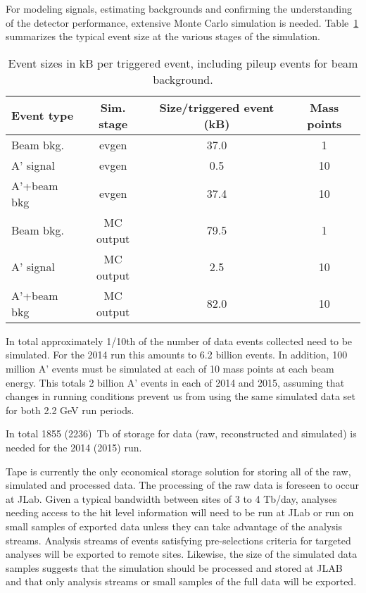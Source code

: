 For modeling signals, estimating backgrounds and confirming the understanding of the detector 
performance, extensive Monte Carlo simulation is needed. Table~\ref{tab:mc_event_size} summarizes 
the typical event size at the various stages of the simulation. 
\begin{table}[]
\centering
\begin{tabular}{|lccc|}
\hline
Event type & Sim. stage & Size/triggered event (kB) & Mass points  \\
\hline
Beam bkg.  & evgen	& 37.0	& 1	\\
A' signal & evgen	& 0.5	& 10	\\
A'+beam bkg & evgen	& 37.4	& 10	\\
\hline
Beam bkg.  & MC output	& 79.5	& 1	\\
A' signal & MC output	& 2.5	& 10	\\
A'+beam bkg & MC output	& 82.0	& 10	\\
\hline
\end{tabular}
\caption{{\small Event sizes in kB per triggered event, including pileup events for beam background. }}
\label{tab:mc_event_size}
\end{table}

In total approximately 1/10th of the number of data events collected need to be simulated. For the 2014 run this amounts to 6.2 billion events.
In addition, 100 million A' events must be simulated at each of 10 mass points at each beam energy. 
This totals 2 billion A' events in each of 2014 and 2015, assuming that changes in running conditions prevent us from using the same simulated data set for both 2.2 GeV run periods.

In total 1855 (2236)~Tb of storage for data (raw, reconstructed and simulated) is needed for the 2014 (2015) run.

Tape is currently the only economical storage
solution for storing all of the raw, simulated and processed data.
The processing of the raw data is foreseen to occur at JLab. Given a
typical bandwidth between sites of 3 to 4 Tb/day, analyses needing
access to the hit level information will need to be run at JLab or run
on small samples of exported data unless they can take advantage of the
analysis streams. Analysis streams of events satisfying
pre-selections criteria for targeted analyses will be exported to remote
sites. Likewise, the size of the simulated data samples suggests that
the simulation should be processed and stored at JLAB and that 
only analysis streams or small samples of the full data will be
exported.

